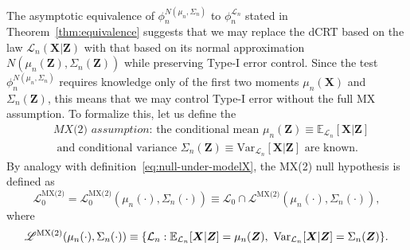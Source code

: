 \documentclass[12pt]{article}
\theoremstyle{definition}
\theoremstyle{remark}
\newcommand{\prx}{\bm X}
\newcommand{\prz}{\bm Z}
\begin{document}
The asymptotic equivalence of $\phi_n^{N(\mu_n, \Sigma_n)}$ to $\phi_n^{\mathcal L_n}$ stated in Theorem~\ref{thm:equivalence} suggests that we may replace the dCRT based on the law $\mathcal L_n(\prx|\prz)$ with that based on its normal approximation $N(\mu_n(\prz), \Sigma_n(\prz))$ while preserving Type-I error control. Since the test $\phi_n^{N(\mu_n, \Sigma_n)}$ requires knowledge only of the first two moments $\mu_n(\prx)$ and $\Sigma_n(\prz)$, this means that we may control Type-I error without the full MX assumption. To formalize this, let us define the 
\begin{equation}
	\begin{split}
&\textit{MX(2) assumption: } \text{the conditional mean } \mu_n(\prz) \equiv \mathbb E_{\mathcal L_n}[\prx|\prz] \\ 
&\text{ and conditional variance } \Sigma_n(\prz) \equiv \text{Var}_{\mathcal L_n}[\prx|\prz] \text{ are known}.
	\label{eq:mx-2-assumption}
	\end{split}
\end{equation}
By analogy with definition~\eqref{eq:null-under-modelX}, the MX(2) null hypothesis is defined as 
\begin{equation}
	\mathscr L_0^{\text{MX(2)}} = \mathscr L_0^{\text{MX(2)}}(\mu_n(\cdot), \Sigma_n(\cdot)) \equiv \mathscr L_{0} \cap \mathscr L^{\text{MX(2)}}(\mu_n(\cdot), \Sigma_n(\cdot)),
	\label{mx2-null}
\end{equation}
where
\begin{equation*}
	\begin{split}
		\mathscr L^{\textnormal{MX(2)}}(\mu_n(\cdot), \Sigma_n(\cdot)) \equiv \{\mathcal L_n: \mathbb E_{\mathcal L_n}[\prx|\prz] = \mu_n(\prz),\ \text{Var}_{\mathcal L_n}[\prx|\prz] = \Sigma_n(\prz)\}.
	\end{split}
\end{equation*}
\end{document}
